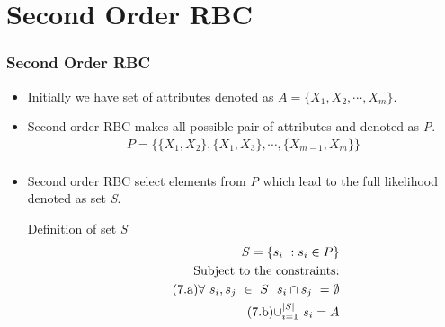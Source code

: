 \documentclass[10pt, blue,subsection=true, compress]{beamer}
\begin{document}

\section{Second Order RBC}
\begin{frame}\frametitle{Second Order RBC}
\begin{itemize}
\item  Initially we have set of attributes denoted as $A = \{ X_1, X_2, \cdots, X_m\}$. 
\item Second order RBC makes all possible pair of attributes and denoted as \textit{P}.
\begin{align*}
 P = \{ \{ X_1, X_2\}, \{ X_1, X_3\}, \cdots, \{ X_{m-1}, X_m\}\} \\
\end{align*}
\item Second order RBC select elements from \textit{P} which lead to the full likelihood denoted as set \textit{S}. 
\begin{block}{Definition of set \textit{S}}
\begin{align}
\label{eq:s}
    S = \{ s_i ~: s_i \in P  \}\\
   \text{Subject to the constraints:} \notag \\
   \nonumber \tag{7.a} \forall~ s_i, s_j ~ \in ~S ~~ s_i \cap s_j ~ = \emptyset \\
   \nonumber \tag{7.b} \displaystyle{\cup_{i=1}^{|S|}} ~ s_i = A 
\end{align}
\end{block}
\end{itemize}
\end{frame}
\end{document}

